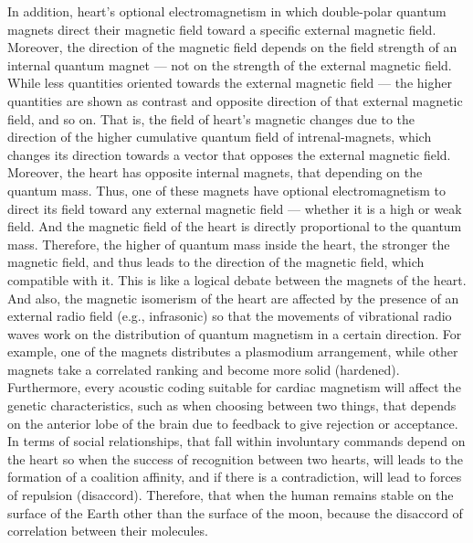 \begin{Summary}
{{{{In addition, heart's optional electromagnetism in which double-polar quantum magnets direct their magnetic field toward a specific external magnetic field. Moreover, the direction of the magnetic field depends on the field strength of an internal quantum magnet — not on the strength of the external magnetic field. While less quantities oriented towards the external magnetic field — the higher quantities are shown as contrast and opposite direction of that external magnetic field, and so on. That is, the field of heart's magnetic changes due to the direction of the higher cumulative quantum field of intrenal-magnets, which changes its direction towards a vector that opposes the external magnetic field. Moreover, the heart has opposite internal magnets, that depending on the quantum mass. Thus, one of these magnets have optional electromagnetism to direct its field toward any external magnetic field — whether it is a high or weak field. And the magnetic field of the heart is directly proportional to the quantum mass. Therefore, the higher of quantum mass inside the heart, the stronger the magnetic field, and thus leads to the direction of the magnetic field, which compatible with it. This is like a logical debate between the magnets of the heart. And also, the magnetic isomerism of the heart are affected by the presence of an external radio field (e.g., infrasonic) so that the movements of vibrational radio waves work on the distribution of quantum magnetism in a certain direction. For example, one of the magnets distributes a plasmodium arrangement, while other magnets take a correlated ranking and become more solid (hardened). Furthermore, every acoustic coding suitable for cardiac magnetism will affect the genetic characteristics, such as when choosing between two things, that depends on the anterior lobe of the brain due to feedback to give rejection or acceptance. In terms of social relationships, that fall within involuntary commands depend on the heart so when the success of recognition between two hearts, will leads to the formation of a coalition affinity, and if there is a contradiction, will lead to forces of repulsion (disaccord). Therefore, that when the human remains stable on the surface of the Earth other than the surface of the moon, because the disaccord of correlation between their molecules.
}}}}
\end{Summary}
